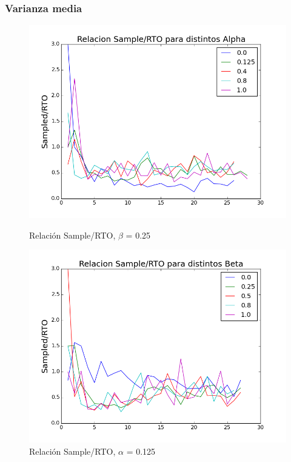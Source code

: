 \subsubsection{Varianza media}

\begin{figure}[H]
\begin{minipage}{0.5\linewidth}
\includegraphics[width=\linewidth]{../src/alphavar2.png}
\caption{Relación Sample/RTO, $\beta$ = 0.25}\label{fig:alpha-var2-nodrop}
\end{minipage}
\hfill
\begin{minipage}{0.5\linewidth}
\includegraphics[width=\linewidth]{../src/betavar2.png}
\caption{Relación Sample/RTO, $\alpha$ = 0.125}\label{fig:beta-var2-nodrop}
\end{minipage}
\end{figure}

